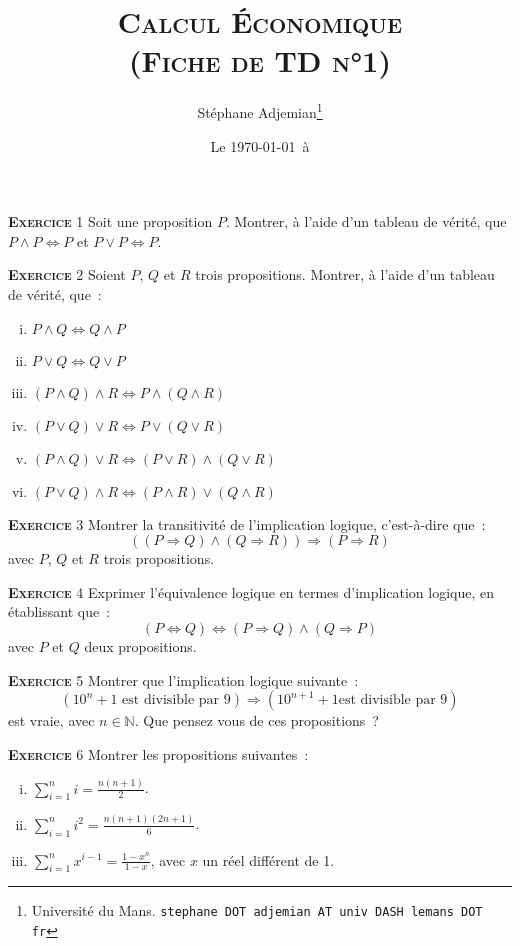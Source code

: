 \documentclass[10pt,a4paper,notitlepage]{article}
\newcommand{\exercice}[1]{\textsc{\textbf{Exercice}} #1}
\begin{document}
\title{\textsc{Calcul Économique\\ \small{(Fiche de TD n°1)}}}
\author{Stéphane Adjemian\thanks{Université du Mans. \texttt{stephane DOT adjemian AT univ DASH lemans DOT fr}}}
\date{Le \today\ à \thistime}

\maketitle

\exercice{1} Soit une proposition $P$. Montrer, à l'aide d'un tableau
de vérité, que $P \land P \Leftrightarrow P$ et $P \lor P
\Leftrightarrow P$.

\bigskip

\exercice{2} Soient $P$, $Q$ et $R$ trois propositions. Montrer, à l'aide d'un tableau
de vérité, que :
\begin{enumerate}[(i)]
\item $P \land Q \Leftrightarrow Q \land P$
\item $P \lor Q \Leftrightarrow Q \lor P$
\item $(P \land Q) \land R \Leftrightarrow P \land (Q \land R)$
\item $(P \lor Q) \lor R \Leftrightarrow P \lor (Q \lor R)$
\item $(P \land Q) \lor R \Leftrightarrow (P \lor R) \land (Q \lor R)$
\item $(P \lor Q) \land R \Leftrightarrow (P \land R) \lor (Q \land R)$
\end{enumerate}

\bigskip

\exercice{3} Montrer la transitivité de l'implication logique, c'est-à-dire
que :
\[
((P \Rightarrow Q) \land (Q \Rightarrow R)) \Rightarrow (P \Rightarrow R)
\]
avec $P$, $Q$ et $R$ trois propositions.

\bigskip

\exercice{4} Exprimer l'équivalence logique en termes d'implication logique, en
établissant que :
\[
(P \Leftrightarrow Q) \Leftrightarrow (P \Rightarrow Q) \land (Q
\Rightarrow P)
\]
avec $P$ et $Q$ deux propositions.

\bigskip

\exercice{5} Montrer que l'implication logique suivante :
\[
(10^n+1 \text{ est divisible par } 9) \Rightarrow (10^{n+1}+1 \text{
  est divisible par 9})
\]
est vraie, avec $n\in\mathbb N$. Que pensez vous de ces propositions ?

\bigskip

\exercice{6} Montrer les propositions suivantes :
\begin{enumerate}[(i)]
\item $\sum_{i=1}^n i = \frac{n(n+1)}{2}$.
\item $\sum_{i=1}^n i^2 = \frac{n(n+1)(2n+1)}{6}$.
\item $\sum_{i=1}^nx^{i-1} = \frac{1-x^{n}}{1-x}$, avec $x$ un réel différent de 1.
\end{enumerate}
\end{document}
